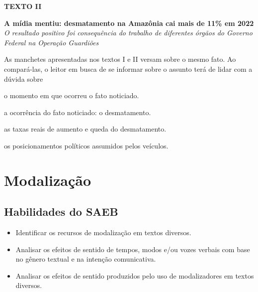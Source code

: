 
\textbf{TEXTO II}

\begin{myquote}
\textbf{A mídia mentiu: desmatamento na Amazônia cai mais de 11\% em
2022} \emph{O resultado positivo foi consequência do trabalho de
diferentes órgãos do Governo Federal na Operação Guardiões}
\end{myquote}


As manchetes apresentadas nos textos I e II versam sobre o mesmo fato.
Ao compará-las, o leitor em busca de se informar sobre o assunto terá de
lidar com a dúvida sobre

\begin{escolha}
\item o momento em que ocorreu o fato noticiado.

\item a ocorrência do fato noticiado: o desmatamento.

\item as taxas reais de aumento e queda do desmatamento.

\item os posicionamentos políticos assumidos pelos veículos.
\end{escolha}

\chapter{Modalização}

\section*{Habilidades do SAEB} 

\begin{itemize}
\item Identificar os recursos de modalização
em textos diversos. 
\item Analisar os efeitos de sentido de tempos, modos
e/ou vozes verbais com base no gênero textual e na intenção
comunicativa.
\item Analisar os efeitos de sentido produzidos pelo uso de
modalizadores em textos diversos.
\end{itemize}

